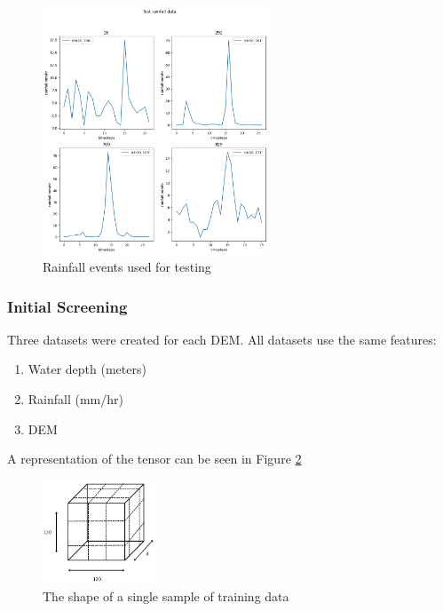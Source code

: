 \begin{figure}[htbp]
	\includegraphics[width=0.6\textwidth]{../Figures/test_rainfall_events.png}
	\centering
	\caption[Rainfall Test]{Rainfall events used for testing} 
	\label{fig:4.4}
\end{figure}

\subsubsection*{Initial Screening}
Three datasets were created for each DEM. All datasets use the same features:
\begin{enumerate}
	\item Water depth (meters)
	\item Rainfall (mm/hr)
	\item DEM
\end{enumerate}

A representation of the tensor can be seen in Figure \ref{fig:4.5} \\

\begin{figure}[htbp]
	\includegraphics[width=0.3\textwidth]{../Figures/dataset_visualization}
	\centering
	\caption[training data]{The shape of a single sample of training data}
	\label{fig:4.5}
\end{figure}

